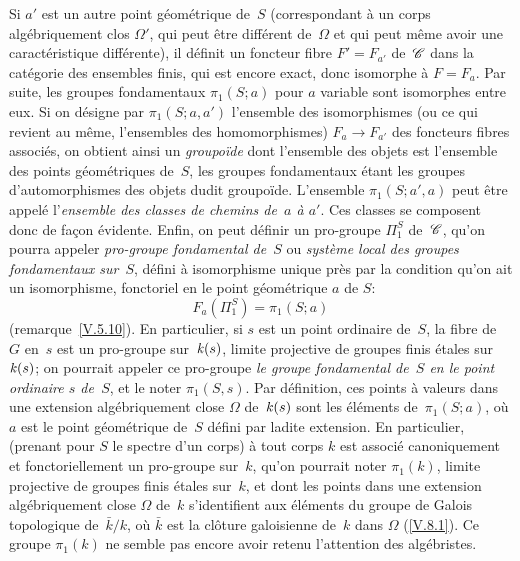Si $a'$ est un autre point g\'eom\'etrique de~$S$ (correspondant
\`a un corps alg\'ebriquement clos $\Omega'$, qui peut \^etre
diff\'erent de~$\Omega$ et qui peut m\^eme avoir une
caract\'eristique diff\'erente), il d\'efinit un foncteur fibre
$F'=F_{a'}$ de~$\cal{C}$ dans la cat\'egorie des ensembles finis,
qui est encore exact, donc isomorphe \`a $F=F_a$. Par suite, les
groupes fondamentaux $\pi_1(S;a)$
\label{indnot:eg1}pour $a$ variable sont isomorphes entre eux. Si on d\'esigne par
$\pi_1(S;a,a')$
\label{indnot:eh}l'ensemble des isomorphismes (ou ce qui revient au m\^eme,
l'ensembles des homomorphismes) $F_a\to F_{a'}$ des foncteurs fibres
associ\'es, on obtient ainsi un \emph{groupoïde} dont
l'ensemble des objets est l'ensemble des points g\'eom\'etriques
de~$S$, les groupes fondamentaux \'etant les groupes
d'automorphismes des objets dudit groupo\"ide. L'ensemble
$\pi_1(S;a',a)$ peut \^etre appel\'e l'\emph{ensemble des classes
de chemins de~$a$ à $a'$}. Ces classes se composent donc de fa\c con \'evidente. Enfin, on peut d\'efinir un pro-groupe $\Pi_1^S$
de~$\cal{C}$, qu'on pourra appeler \emph{pro-groupe fondamental
de}~$S$
ou \emph{système local des groupes fondamentaux sur}~$S$,
d\'efini \`a isomorphisme unique pr\`es par la condition qu'on
ait un isomorphisme, fonctoriel en le point g\'eom\'etrique $a$ de
$S$:
$$
F_a(\Pi_1^S)=\pi_1(S;a)
$$
(\cf remarque~\ref{V.5.10}). En particulier, si $s$ est un point
ordinaire de~$S$, la fibre de~$G$ en~$s$ est un pro-groupe sur~$\mathit{k}(s)$,
limite projective de groupes finis \'etales sur~$\mathit{k}(s)$; on pourrait
appeler ce pro-groupe \emph{le groupe fondamental de~$S$ en le point
ordinaire $s$ de~$S$}, et le noter $\pi_1(S,s)$. Par d\'efinition, ces
points \`a valeurs dans une extension alg\'ebriquement close
$\Omega$ de~$\mathit{k}(s)$ sont les \'el\'ements de~$\pi_1(S;a)$, o\`u
$a$ est le point g\'eom\'etrique de~$S$ d\'efini par ladite
extension. En particulier, (prenant pour $S$ le spectre d'un corps)
\`a tout corps $k$ est associ\'e canoniquement et fonctoriellement
un pro-groupe sur~$k$, qu'on pourrait noter $\pi_1(k)$, limite
projective de groupes finis \'etales sur~$k$, et dont les points
dans une extension alg\'ebriquement close $\Omega$ de~$k$
s'identifient
aux \'el\'ements du groupe de Galois topologique de~$\bar{k}/k$,
o\`u $\bar{k}$ est la cl\^oture galoisienne de~$k$ dans $\Omega$
(\cf \ref{V.8.1}). Ce groupe $\pi_1(k)$ ne semble pas encore avoir
retenu l'attention des alg\'ebristes.

